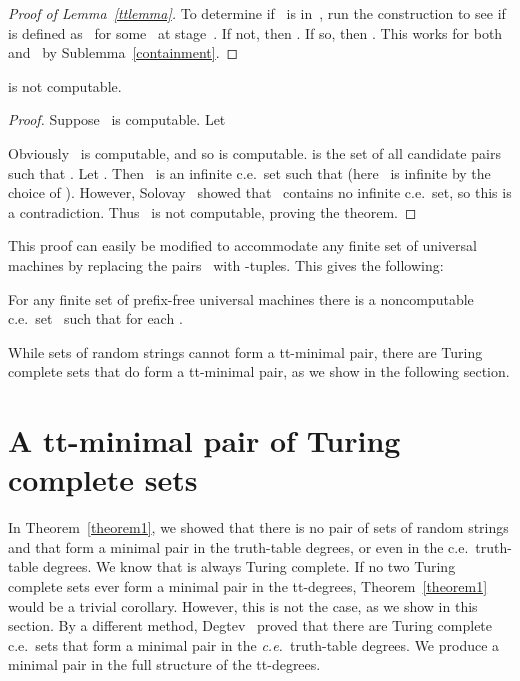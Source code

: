 \documentclass{LMCS}
\newcommand{\0}{\mathbf{0}}
\newcommand{\ce}{c.e.\ }
\newcommand{\<}{\langle}
\renewcommand{\>}{\rangle}
\begin{document}
\begin{proof}[Proof of Lemma~\ref{ttlemma}]
To determine if~ is in~, run the construction to see if 
is defined as~ for some~ at stage~.  If not, then .  If
so, then .  This works for both
 and~ by Sublemma~\ref{containment}.
\end{proof}

\begin{lem}  is not computable.
\end{lem}

\begin{proof}
Suppose~ is computable.  Let

Obviously~ is computable, and so  is computable.  is the set of
all candidate pairs  such that . Let . Then~ is an infinite \ce set such that 
(here~ is infinite by the choice of ). However,
Solovay~\cite{Solovay} showed that~ contains no infinite \ce set, so this
is a contradiction. Thus~ is not computable, proving the theorem.
\end{proof}

This proof can easily be modified to accommodate any finite set of universal
machines by replacing the pairs~ with -tuples.  This gives the
following:

\begin{thm}\label{thmfinite}
For any finite set of prefix-free universal machines 
there is a noncomputable \ce set~ such that  for each
.
\end{thm}

While sets of random strings cannot form a tt-minimal pair, there are Turing
complete sets that do form a tt-minimal pair, as we show in the following
section.

\section{A tt-minimal pair of Turing complete sets}\label{minpair}

In Theorem~\ref{theorem1}, we showed that there is no pair of sets of random
strings  and  that form a minimal pair in the
truth-table degrees, or even in the \ce truth-table degrees. We know that
 is always Turing complete. If no two Turing complete sets ever form
a minimal pair in the tt-degrees, Theorem~\ref{theorem1} would be a trivial
corollary. However, this is not the case, as we show in this section. By a
different method, Degtev~\cite{Degtev} proved that there are Turing complete
\ce sets that form a minimal pair in the \emph{c.e.\ }truth-table degrees. We
produce a minimal pair in the full structure of the tt-degrees.
\end{document}
